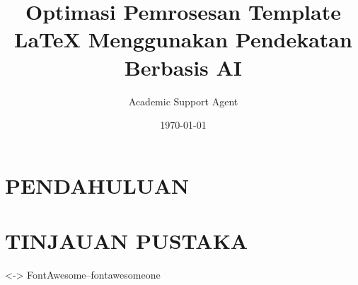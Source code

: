 \documentclass{article}
\title{Optimasi Pemrosesan Template LaTeX Menggunakan Pendekatan Berbasis AI}
\author{Academic Support Agent}
\date{\today}
\begin{document}
\maketitle

\begin{abstract}

\end{abstract}

\chapter{PENDAHULUAN}


\chapter{TINJAUAN PUSTAKA}


\usepackage[letterpaper,margin=0.5in]{geometry}
\usepackage[utf8]{inputenc}
\usepackage{mdwlist}
\usepackage[default]{lato}
\usepackage[T1]{fontenc}
\usepackage{textcomp}
\usepackage{fontawesome5} %
\usepackage{enumitem}
{<-> FontAwesome--fontawesomeone}{}
\DeclareRobustCommand\FAone{\fontencoding{U}\fontfamily{fontawesomeOne}\selectfont}
\pagestyle{empty}
\setlength{\tabcolsep}{0em}

\newenvironment{indentsection}[1]%
{\begin{list}{}%
{\setlength{\leftmargin}{#1}}%
     \item[]
}
{\end{list}}

\newenvironment{unindentsection}[1]%
{\begin{list}{}%
{\setlength{\leftmargin}{-0.5#1}}%
\item[]%
}
{\end{list}}

\newcommand{\headerrow}[2]
{\begin{tabular*}{\linewidth}{l@{\extracolsep{\fill}}r}
#1 &
#2 \\
\end{tabular*}}

\newcommand{\CPP}
{C\nolinebreak[4]\hspace{-.05em}\raisebox{.22ex}{\footnotesize\bf ++}}
\end{document}
